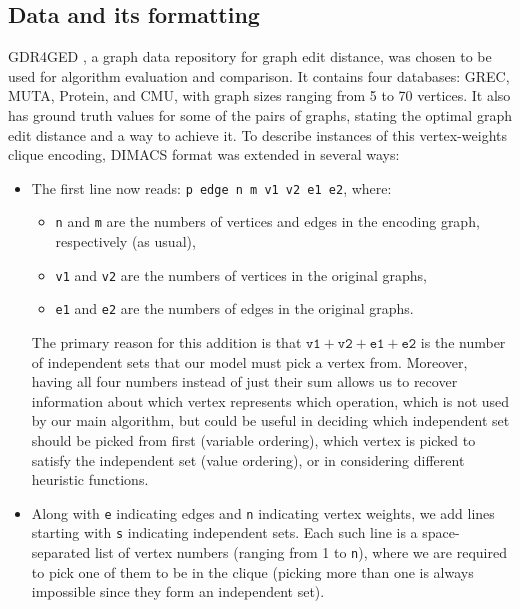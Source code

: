 \documentclass{article}
\theoremstyle{definition}
\begin{document}
\subsection{Data and its formatting}
GDR4GED \cite{abu-aisheh_raveaux_ramel_2015}, a graph data repository for graph edit distance, was chosen to be used for algorithm evaluation and comparison. It contains four databases: GREC, MUTA, Protein, and CMU, with graph sizes ranging from 5 to 70 vertices. It also has ground truth values for some of the pairs of graphs, stating the optimal graph edit distance and a way to achieve it. To describe instances of this vertex-weights clique encoding, DIMACS format was extended in several ways:
\begin{itemize}
\item The first line now reads: \texttt{p edge n m v1 v2 e1 e2}, where:
  \begin{itemize}
  \item \texttt{n} and \texttt{m} are the numbers of vertices and edges in the encoding graph, respectively (as usual),
  \item \texttt{v1} and \texttt{v2} are the numbers of vertices in the original graphs,
  \item \texttt{e1} and \texttt{e2} are the numbers of edges in the original graphs.
  \end{itemize}
  The primary reason for this addition is that $\texttt{v1}+\texttt{v2}+\texttt{e1}+\texttt{e2}$ is the number of independent sets that our model must pick a vertex from. Moreover, having all four numbers instead of just their sum allows us to recover information about which vertex represents which operation, which is not used by our main algorithm, but could be useful in deciding which independent set should be picked from first (variable ordering), which vertex is picked to satisfy the independent set (value ordering), or in considering different heuristic functions.
  \item Along with \texttt{e} indicating edges and \texttt{n} indicating vertex weights, we add lines starting with \texttt{s} indicating independent sets. Each such line is a space-separated list of vertex numbers (ranging from 1 to \texttt{n}), where we are required to pick one of them to be in the clique (picking more than one is always impossible since they form an independent set).
\end{itemize}
\end{document}
